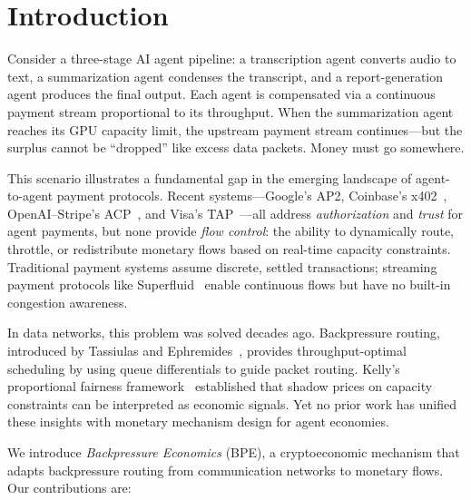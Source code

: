\section{Introduction}
\label{sec:intro}

Consider a three-stage AI agent pipeline: a transcription agent converts audio to text,
a summarization agent condenses the transcript, and a report-generation agent produces
the final output. Each agent is compensated via a continuous payment stream proportional
to its throughput. When the summarization agent reaches its GPU capacity limit, the upstream
payment stream continues---but the surplus cannot be ``dropped'' like excess data packets.
Money must go somewhere.

This scenario illustrates a fundamental gap in the emerging landscape of agent-to-agent
payment protocols. Recent systems---Google's AP2, Coinbase's x402~\cite{coinbase2025x402},
OpenAI--Stripe's ACP~\cite{openai2025acp}, and Visa's TAP~\cite{visa2025tap}---all address
\emph{authorization} and \emph{trust} for agent payments, but none provide \emph{flow control}:
the ability to dynamically route, throttle, or redistribute monetary flows based on real-time
capacity constraints. Traditional payment systems assume discrete, settled transactions; streaming
payment protocols like Superfluid~\cite{superfluid2024} enable continuous flows but have no
built-in congestion awareness.

In data networks, this problem was solved decades ago. Backpressure routing, introduced by
Tassiulas and Ephremides~\cite{tassiulas1992stability}, provides throughput-optimal scheduling
by using queue differentials to guide packet routing. Kelly's proportional fairness
framework~\cite{kelly1998rate} established that shadow prices on capacity constraints can be
interpreted as economic signals. Yet no prior work has unified these insights with monetary
mechanism design for agent economies.

We introduce \emph{Backpressure Economics} (BPE), a cryptoeconomic mechanism that adapts
backpressure routing from communication networks to monetary flows. Our contributions are:

